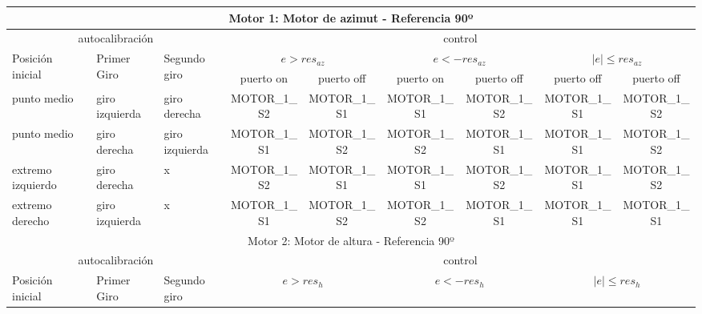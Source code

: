 \begin{table}[ht]
\resizebox{\linewidth}{!}
{
  \begin{threeparttable}		
	\begin{tabular}{|p{1.5cm}|p{1.5cm}|p{1.5cm}|c|c|c|c|c|c|}
		\hline 
		\multicolumn{9}{|c|}{Motor 1: Motor de azimut - Referencia 90º } \\
		\hline 
		\multicolumn{3}{|c|}{autocalibración} & \multicolumn{6}{c|}{control } \\
		\hline 
		\multirow{2}{1.4cm}{Posición inicial} &\multirow{2}{1.4cm}{ Primer Giro} & \multirow{2}{1.4cm}{Segundo giro} &\multicolumn{2}{c|}{$e>res_{az}$} &\multicolumn{2}{c|}{$e<-res_{az}$} &\multicolumn{2}{c|}{$|e|\leq res_{az}$} \\ \cline{4-9}
		
		 & &  & puerto on & puerto off &puerto on & puerto off&puerto off & puerto off\\ 
		\hline 
		punto medio & giro izquierda & giro derecha & MOTOR\_1\_S2 & MOTOR\_1\_S1  & MOTOR\_1\_S1& MOTOR\_1\_S2& MOTOR\_1\_S1 & MOTOR\_1\_S2 \\ 
		\hline 
		punto medio & giro derecha & giro izquierda &MOTOR\_1\_S1  &MOTOR\_1\_S2
		& MOTOR\_1\_S2&  MOTOR\_1\_S1 &MOTOR\_1\_S1 & MOTOR\_1\_S2 	\\
		\hline 
		extremo izquierdo & giro derecha & x &MOTOR\_1\_S2  & MOTOR\_1\_S1  & MOTOR\_1\_S1& MOTOR\_1\_S2 &MOTOR\_1\_S1 & MOTOR\_1\_S2 \\ 
		\hline 
		extremo derecho & giro izquierda & x & MOTOR\_1\_S1&MOTOR\_1\_S2  & MOTOR\_1\_S2 &MOTOR\_1\_S1 &MOTOR\_1\_S1 &MOTOR\_1\_S1  \\ 
		\hline 
		\hline 
		\multicolumn{9}{|c|}{Motor 2: Motor de altura - Referencia 90º } \\
		\hline 
		\multicolumn{3}{|c|}{autocalibración} & \multicolumn{6}{c|}{control } \\
		\hline 
		\multirow{2}{1.4cm}{Posición inicial} &\multirow{2}{1.4cm}{ Primer Giro} & \multirow{2}{1.4cm}{Segundo giro} &\multicolumn{2}{c|}{$e>res_h$} & \multicolumn{2}{c|}{$e<-res_h$\tnote{1}}  &\multicolumn{2}{c|}{$|e|\leq res_h$} \\ \cline{4-9}
		

\end{tabular}
\end{threeparttable}}
\end{table}
